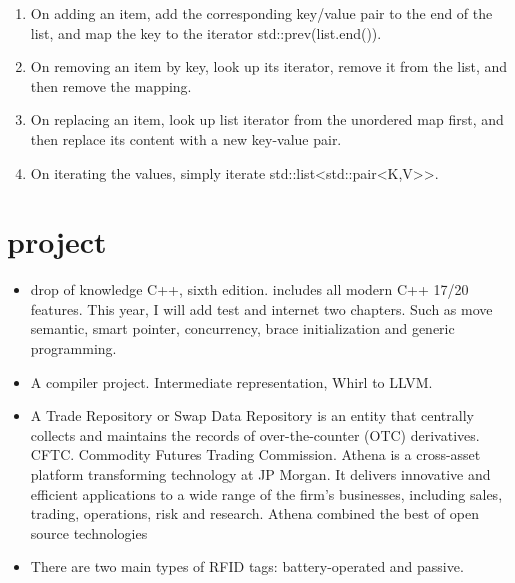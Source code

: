 \documentclass[a4paper,11pt,twoside]{book}
\begin{document}
\begin{itemize}
\begin{enumerate}
	\item On adding an item, add the corresponding key/value pair to the end of the list, and map the key to the iterator std::prev(list.end()).
	
	\item On removing an item by key, look up its iterator, remove it from the list, and then remove the mapping.
	
	\item On replacing an item, look up list iterator from the unordered map first, and then replace its content with a new key-value pair.
	
	\item On iterating the values, simply iterate std::list<std::pair<K,V>>.
\end{enumerate}

	
\end{itemize}

\section{project}
\begin{itemize}
	\item drop of knowledge C++, sixth edition. includes all modern C++ 17/20 features. This year, I will add test and internet two chapters.  Such as move semantic,  smart pointer, concurrency, brace initialization and generic programming. 
	
	\item A compiler project. Intermediate representation, Whirl to LLVM. 
	
	\item A Trade Repository or Swap Data Repository is an entity that centrally collects and maintains the records of over-the-counter (OTC) derivatives. CFTC. Commodity Futures Trading Commission.   Athena is a cross-asset platform transforming technology at JP Morgan. It delivers innovative and efficient applications to a wide range of the firm's businesses, including sales, trading, operations, risk and research. Athena combined the best of open source technologies
	
	\item There are two main types of RFID tags: battery-operated and passive. 
	
\fi

\end{itemize}


\ifx \allfiles \undefined
\end{document}
